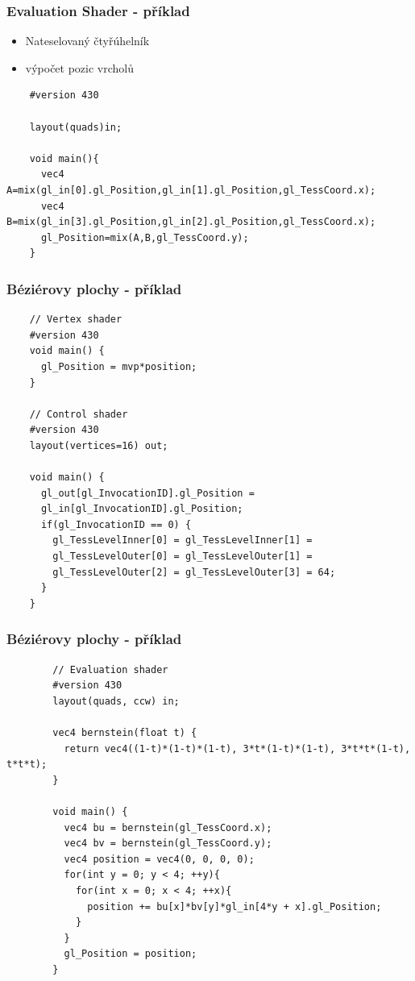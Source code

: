 \begin{frame}[fragile]
\frametitle{Evaluation Shader - příklad}
	\begin{itemize}
		\item Nateselovaný čtyřúhelník
		\item výpočet pozic vrcholů
	\end{itemize}
	{\scriptsize
	\begin{verbatim}
	#version 430

	layout(quads)in;

	void main(){
	  vec4 A=mix(gl_in[0].gl_Position,gl_in[1].gl_Position,gl_TessCoord.x);
	  vec4 B=mix(gl_in[3].gl_Position,gl_in[2].gl_Position,gl_TessCoord.x);
	  gl_Position=mix(A,B,gl_TessCoord.y);
	}
	\end{verbatim}
	}
\end{frame}




\begin{frame}[fragile]
  \frametitle{Béziérovy plochy - příklad}
	{\scriptsize
	\begin{verbatim}
	// Vertex shader	
	#version 430
	void main() {
	  gl_Position = mvp*position;
	}

	// Control shader
	#version 430
	layout(vertices=16) out;

	void main() {
	  gl_out[gl_InvocationID].gl_Position =
	  gl_in[gl_InvocationID].gl_Position;
	  if(gl_InvocationID == 0) {
	    gl_TessLevelInner[0] = gl_TessLevelInner[1] = 
	    gl_TessLevelOuter[0] = gl_TessLevelOuter[1] =
	    gl_TessLevelOuter[2] = gl_TessLevelOuter[3] = 64;
	  }
	}
	\end{verbatim}
	}
\end{frame}

\begin{frame}[fragile]
    \frametitle{Béziérovy plochy - příklad}
  	{\scriptsize
		\begin{verbatim}
		// Evaluation shader
		#version 430
		layout(quads, ccw) in;

		vec4 bernstein(float t) {
		  return vec4((1-t)*(1-t)*(1-t), 3*t*(1-t)*(1-t), 3*t*t*(1-t), t*t*t);
		}

		void main() {
		  vec4 bu = bernstein(gl_TessCoord.x);
		  vec4 bv = bernstein(gl_TessCoord.y);
		  vec4 position = vec4(0, 0, 0, 0);
		  for(int y = 0; y < 4; ++y){
		    for(int x = 0; x < 4; ++x){
		      position += bu[x]*bv[y]*gl_in[4*y + x].gl_Position;
		    }
		  }
		  gl_Position = position;
		}
  	\end{verbatim}
		}
\end{frame}

